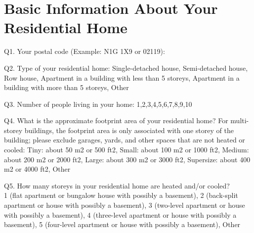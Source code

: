 \documentclass[12pt]{article}
\begin{document}
\pagebreak

\section{Basic Information About Your Residential Home}


\begin{Form}
Q1. Your postal code (Example: N1G 1X9 or 02119):	
\TextField[name=Q1_1, width=5em, height=1em]{}
	
Q2. Type of your residential home:
\ChoiceMenu[combo, name=Q2_1,width=8cm,charsize=10pt,default=Single-detached house]{}
{Single-detached house, Semi-detached house, Row house, Apartment in a building with less than 5 storeys, Apartment in a building with more than 5 storeys, Other} \\	

Q3. Number of people living in your home:
\ChoiceMenu[combo, name=Q3_1,width=3cm,charsize=10pt,default=4]{}
{1,2,3,4,5,6,7,8,9,10}

Q4. What is the approximate footprint area of your residential home? For multi-storey buildings, the footprint area is only associated with one storey of the building; please exclude garages, yards, and other
spaces that are not heated or cooled: 
\ChoiceMenu[combo, name=Q4_1,width=6.5cm,charsize=10pt,default=Small: about 100 m2 or 1000 ft2]{}
{Tiny: about 50 m2 or 500 ft2, Small: about 100 m2 or 1000 ft2, Medium: about 200 m2 or 2000 ft2, Large: about 300 m2 or 3000 ft2, Supersize: about 400 m2 or 4000 ft2, Other}\\
\end{Form}

\begin{Form}
Q5. How many storeys in your residential home are heated and/or cooled? \\ 
\ChoiceMenu[combo, name=Q5_1, width=10cm, charsize=10pt, default=1 (flat apartment or bungalow house with possibly a basement)]{}
{1 (flat apartment or bungalow house with possibly a basement), 2 (back-split apartment or house with possibly a basement), 3 (two-level apartment or house with possibly a basement), 4 (three-level apartment or house with possibly a basement), 5 (four-level apartment or house with possibly a basement), Other}\\
\end{Form}
\end{document}
